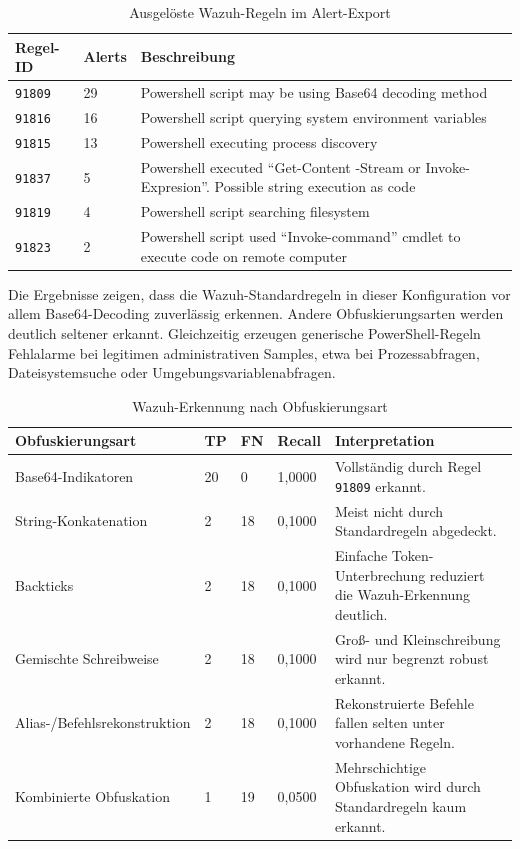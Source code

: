 \documentclass[12pt,a4paper,oneside,parskip=half]{scrreprt}
\begin{document}
\begin{table}[H]
\centering
\caption{Ausgelöste Wazuh-Regeln im Alert-Export}
\small
\begin{tabularx}{\textwidth}{|L{2cm}|C{1.8cm}|Y|}
\hline
\textbf{Regel-ID} & \textbf{Alerts} & \textbf{Beschreibung}\\
\hline
\texttt{91809} & 29 & Powershell script may be using Base64 decoding method\\
\hline
\texttt{91816} & 16 & Powershell script querying system environment variables\\
\hline
\texttt{91815} & 13 & Powershell executing process discovery\\
\hline
\texttt{91837} & 5 & Powershell executed \enquote{Get-Content -Stream or Invoke-Expresion}. Possible string execution as code\\
\hline
\texttt{91819} & 4 & Powershell script searching filesystem\\
\hline
\texttt{91823} & 2 & Powershell script used \enquote{Invoke-command} cmdlet to execute code on remote computer\\
\hline
\end{tabularx}
\end{table}

Die Ergebnisse zeigen, dass die Wazuh-Standardregeln in dieser Konfiguration vor allem Base64-Decoding zuverlässig erkennen. Andere Obfuskierungsarten werden deutlich seltener erkannt. Gleichzeitig erzeugen generische PowerShell-Regeln Fehlalarme bei legitimen administrativen Samples, etwa bei Prozessabfragen, Dateisystemsuche oder Umgebungsvariablenabfragen.

\begin{table}[H]
\centering
\caption{Wazuh-Erkennung nach Obfuskierungsart}
\small
\begin{tabularx}{\textwidth}{|L{3.6cm}|C{1.1cm}|C{1.1cm}|C{1.5cm}|Y|}
\hline
\textbf{Obfuskierungsart} & \textbf{TP} & \textbf{FN} & \textbf{Recall} & \textbf{Interpretation}\\
\hline
Base64-Indikatoren & 20 & 0 & 1{,}0000 & Vollständig durch Regel \texttt{91809} erkannt.\\
\hline
String-Konkatenation & 2 & 18 & 0{,}1000 & Meist nicht durch Standardregeln abgedeckt.\\
\hline
Backticks & 2 & 18 & 0{,}1000 & Einfache Token-Unterbrechung reduziert die Wazuh-Erkennung deutlich.\\
\hline
Gemischte Schreibweise & 2 & 18 & 0{,}1000 & Groß- und Kleinschreibung wird nur begrenzt robust erkannt.\\
\hline
Alias-/Befehlsrekonstruktion & 2 & 18 & 0{,}1000 & Rekonstruierte Befehle fallen selten unter vorhandene Regeln.\\
\hline
Kombinierte Obfuskation & 1 & 19 & 0{,}0500 & Mehrschichtige Obfuskation wird durch Standardregeln kaum erkannt.\\
\hline
\end{tabularx}
\end{table}
\end{document}
